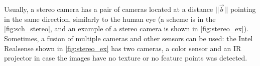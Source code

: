 Usually, a stereo camera has a pair of cameras located at a distance $||\vec{b}||$ pointing in the same direction, similarly to the human eye (a scheme is in the \autoref{fig:sch_stereo}, and an example of a stereo camera is shown in \autoref{fig:stereo_ex}). 
Sometimes, a fusion of multiple cameras and other sensors can be used: the Intel Realsense shown in \autoref{fig:stereo_ex} has two cameras, a color sensor and an IR projector in case the images have no texture or no feature points was detected.




